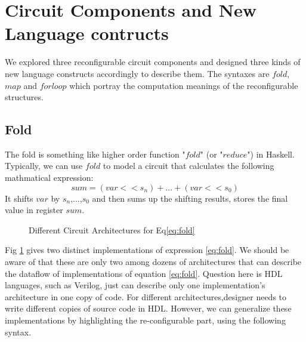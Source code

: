 \section{Circuit Components and  New Language contructs}\label{sec:syntax}
We explored three reconfigurable circuit components and designed three kinds of new language constructs accordingly to describe them. The syntaxes are $fold$, $map$ and $forloop$ which portray the computation meanings of the reconfigurable structures.

\subsection{Fold}
The fold is something like higher order function\cite{highorderfunction} "$fold$" (or "$reduce$") in Haskell. Typically, we can use $fold$ to model a circuit that calculates the following mathmatical expression:
\begin{equation} \label{eq:fold} sum = (var << s_n) + ... + (var << s_0) \end{equation}
It shifts $var$ by $s_n$,...,$s_0$ and then sums up the shifting results, stores the final value in register $sum$.
\begin{figure}[ht]
\centering
{}
\caption{Different Circuit Architectures for Eq\eqref{eq:fold}}
\label{fig-fold}
\end{figure}
Fig \ref{fig-fold} gives two distinct implementations of expression \eqref{eq:fold}. We should be aware of that these are only two among dozens of architectures that can describe the dataflow of implementations of equation \eqref{eq:fold}. Question here is HDL languages, such as Verilog, just can describe only one implementation's architecture in one copy of code. For different architectures,designer needs to write different copies of source code in HDL. However, we can generalize these implementations by highlighting the re-configurable part, using the following syntax.

